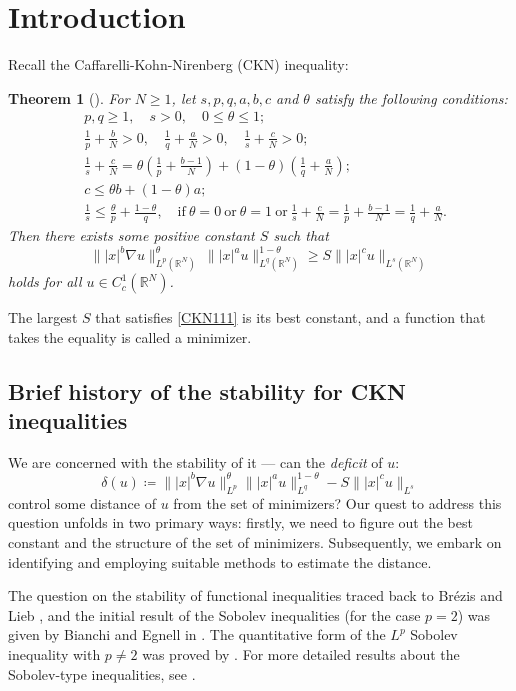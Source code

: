 \documentclass[11pt]{article}
\newtheorem{theorem}{Theorem}[section]
\newcommand{\R}{\mathbb{R}}
\numberwithin{equation}{section}
\begin{document}
\section{Introduction}
Recall the Caffarelli-Kohn-Nirenberg (CKN) inequality:
\begin{theorem}[\cite{CKN1984}]
    For $N\ge 1$, let $s,p,q,a,b,c$ and $\theta$ satisfy the following conditions:
    \begin{align*}
        & p,q\ge 1,\quad s>0,\quad 0\le \theta\le 1;\\
        & \frac 1p+\frac{b}{N}>0,\quad \frac 1q + \frac{a}{N}>0, \quad \frac 1s + \frac{c}{N}>0;\\
        & \frac 1s + \frac {c}{N} = \theta\left(\frac{1}{p} + \frac{b-1}{N}\right) + (1-\theta)\left(\frac 1q + \frac{a}{N}\right);\\
        & c \le \theta b + (1-\theta)a; \\
        & \frac 1s \le \frac{\theta}{p} + \frac{1-\theta}{q},\quad \text{if}\ \theta =0 \ \text{or}\  \theta=1 \ \text{or} \ \frac 1s + \frac{c}{N} = \frac 1p + \frac{b-1}{N} = \frac 1q + \frac{a}{N}.
    \end{align*}
    Then there exists some positive constant $S$ such that
    \begin{equation}\label{CKN111}
        \big\| |x|^b \nabla u\big\|_{L^p(\R^N)}^\theta\ \big\| |x|^a u\big\|_{L^q(\R^N)}^{1-\theta} \ge S\big\| |x|^c u\big\|_{L^s(\R^N)}
    \end{equation}
    holds for all $u\in C_c^1(\R^N)$.
\end{theorem}
The largest $S$ that satisfies \eqref{CKN111} is its best constant, and a function that takes the equality is called a minimizer.

\subsection{Brief history of the stability for  CKN inequalities}
We are concerned with the stability of it --- can the {\it deficit } of $u$:
\[ \delta(u) \coloneqq \||x|^b\nabla u\|_{L^p}^\theta\||x|^au\|_{L^q}^{1-\theta} - S\||x|^cu\|_{L^s}\]
control  some distance of $u$ from the set of minimizers? Our quest to address this question unfolds in two primary ways: firstly, we need to figure out the best constant and the structure of the set of minimizers. Subsequently, we embark on identifying and employing suitable methods to estimate the distance.

\vskip0.1in
The question on the stability of functional inequalities traced back to Br\'{e}zis and Lieb \cite{Brezis1985}, and the initial result of the Sobolev inequalities (for the case $p=2$) was given by Bianchi and Egnell in \cite{Bianchi1991}. The quantitative form of the $L^p$ Sobolev inequality with $p\neq 2$ was proved by \cite{Cianchi2009, Figalli2018}. For more detailed results about the Sobolev-type inequalities, see \cite{Figalli2022, Chen2013, Gazzola2010, Neumayer2020, Talenti1976, Figalli2013, Cianchi2006, Fusco2007}.
\end{document}
